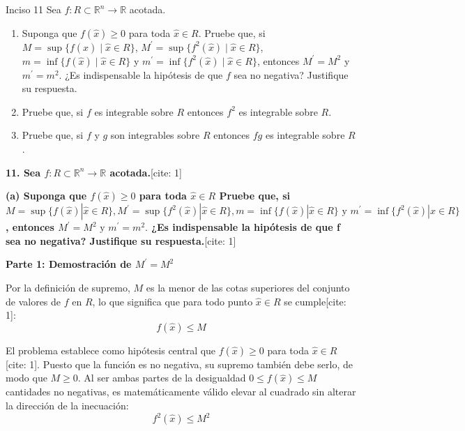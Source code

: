 \documentclass[11pt,letterpaper]{article}
\begin{document}
\begin{inciso}{Inciso 11}
Sea $f:R\subset\mathbb{R}^{n}\rightarrow\mathbb{R}$ acotada.
\begin{enumerate}[label=\alph*)]
    \item Suponga que $f(\hat{x})\ge 0$ para toda $\hat{x}\in R$. Pruebe que, si $M=\sup\{f(\hat{x})\mid\hat{x}\in R\}$, $M^{\prime}=\sup\{f^{2}(\hat{x})\mid\hat{x}\in R\}$, $m=\inf\{f(\hat{x})\mid\hat{x}\in R\}$ y $m^{\prime}=\inf\{f^{2}(\hat{x})\mid\hat{x}\in R\}$, entonces $M^{\prime}=M^{2}$ y $m^{\prime}=m^{2}.$ ¿Es indispensable la hipótesis de que $f$ sea no negativa? Justifique su respuesta.
    \item Pruebe que, si $f$ es integrable sobre $R$ entonces $f^{2}$ es integrable sobre $R$.
    \item Pruebe que, si $f$ y $g$ son integrables sobre $R$ entonces $fg$ es integrable sobre $R$.
\end{enumerate}
\end{inciso}

\textbf{11. Sea $f:R\subset\mathbb{R}^{n}\rightarrow\mathbb{R}$ acotada.}[cite: 1]

\textbf{(a) Suponga que $f(\hat{x})\ge0$ para toda $\hat{x}\in R$ Pruebe que, si $M=\sup\{f(\hat{x})|\hat{x}\in R\}, M^{\prime}=\sup\{f^{2}(\hat{x})|\hat{x}\in R\}, m=\inf\{f(\hat{x})|\hat{x}\in R\} \text{ y } m^{\prime}=\inf\{f^{2}(\hat{x})|\hat{x}\in R\}$, entonces $M^{\prime}=M^{2} \text{ y } m^{\prime}=m^{2}.$ ¿Es indispensable la hipótesis de que f sea no negativa? Justifique su respuesta.}[cite: 1]

\vspace{0.5cm}
\textbf{Parte 1: Demostración de $M^{\prime} = M^{2}$}

Por la definición de supremo, $M$ es la menor de las cotas superiores del conjunto de valores de $f$ en $R$, lo que significa que para todo punto $\hat{x} \in R$ se cumple[cite: 1]:
\begin{equation*}
f(\hat{x}) \le M
\end{equation*}

El problema establece como hipótesis central que $f(\hat{x}) \ge 0$ para toda $\hat{x} \in R$[cite: 1]. Puesto que la función es no negativa, su supremo también debe serlo, de modo que $M \ge 0$. Al ser ambas partes de la desigualdad $0 \le f(\hat{x}) \le M$ cantidades no negativas, es matemáticamente válido elevar al cuadrado sin alterar la dirección de la inecuación:
\begin{equation*}
f^{2}(\hat{x}) \le M^{2}
\end{equation*}
\end{document}
